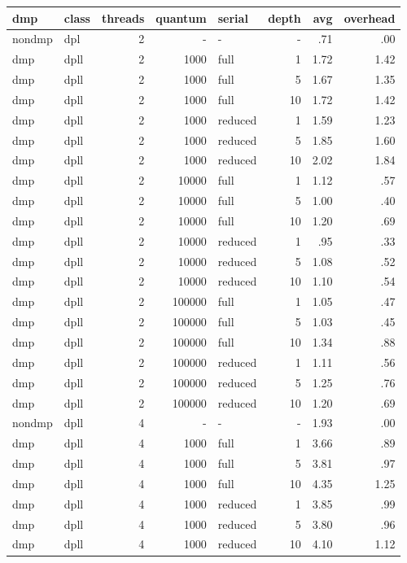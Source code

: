 \begin{center}
\begin{small}
\begin{longtable}{llrrlrrr}
\hline
dmp & class & threads & quantum & serial & depth & avg & overhead\\
\hline
nondmp & dpl & 2 & - & - & - & .71 & .00\\
dmp & dpll & 2 & 1000 & full & 1 & 1.72 & 1.42\\
dmp & dpll & 2 & 1000 & full & 5 & 1.67 & 1.35\\
dmp & dpll & 2 & 1000 & full & 10 & 1.72 & 1.42\\
dmp & dpll & 2 & 1000 & reduced & 1 & 1.59 & 1.23\\
dmp & dpll & 2 & 1000 & reduced & 5 & 1.85 & 1.60\\
dmp & dpll & 2 & 1000 & reduced & 10 & 2.02 & 1.84\\
dmp & dpll & 2 & 10000 & full & 1 & 1.12 & .57\\
dmp & dpll & 2 & 10000 & full & 5 & 1.00 & .40\\
dmp & dpll & 2 & 10000 & full & 10 & 1.20 & .69\\
dmp & dpll & 2 & 10000 & reduced & 1 & .95 & .33\\
dmp & dpll & 2 & 10000 & reduced & 5 & 1.08 & .52\\
dmp & dpll & 2 & 10000 & reduced & 10 & 1.10 & .54\\
dmp & dpll & 2 & 100000 & full & 1 & 1.05 & .47\\
dmp & dpll & 2 & 100000 & full & 5 & 1.03 & .45\\
dmp & dpll & 2 & 100000 & full & 10 & 1.34 & .88\\
dmp & dpll & 2 & 100000 & reduced & 1 & 1.11 & .56\\
dmp & dpll & 2 & 100000 & reduced & 5 & 1.25 & .76\\
dmp & dpll & 2 & 100000 & reduced & 10 & 1.20 & .69\\
\hline
nondmp & dpll & 4 & - & - & - & 1.93 & .00\\
dmp & dpll & 4 & 1000 & full & 1 & 3.66 & .89\\
dmp & dpll & 4 & 1000 & full & 5 & 3.81 & .97\\
dmp & dpll & 4 & 1000 & full & 10 & 4.35 & 1.25\\
dmp & dpll & 4 & 1000 & reduced & 1 & 3.85 & .99\\
dmp & dpll & 4 & 1000 & reduced & 5 & 3.80 & .96\\
dmp & dpll & 4 & 1000 & reduced & 10 & 4.10 & 1.12\\

\end{longtable}
\end{small}
\end{center}

